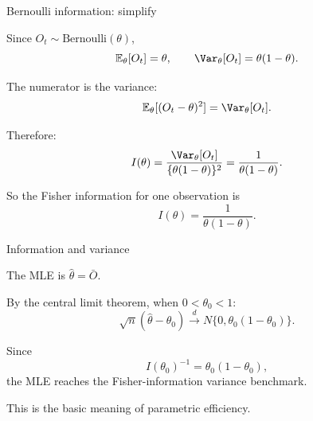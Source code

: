 \documentclass[xcolor={table}, handout]{beamer}
\begin{document}
\note{
\scriptsize \singlespacing

}
\begin{frame}{Bernoulli information: simplify}

\begin{wideitemize}
\item Since $O_t\sim\text{Bernoulli}(\theta)$,
\[
\mathbb{E}_\theta[O_t]=\theta,
\qquad
\Var_\theta[O_t]=\theta(1-\theta).
\]\pause
\item The numerator is the variance:
\[
\mathbb{E}_\theta[(O_t-\theta)^2]
  =
  \Var_\theta[O_t].
\]\pause
\item Therefore:
\[
I(\theta)
  =
  \frac{\Var_\theta[O_t]}
       {\{\theta(1-\theta)\}^2}
  =
  \frac{1}{\theta(1-\theta)}.
\]\pause
\item So the Fisher information for one observation is
\[
I(\theta)=\frac{1}{\theta(1-\theta)}.
\]
\end{wideitemize}

\end{frame}

\note{
\scriptsize \singlespacing

}
\begin{frame}{Information and variance}

\begin{wideitemize}
\item The MLE is $\hat\theta=\bar O$.\pause
\item By the central limit theorem, when $0<\theta_0<1$:
\[
\sqrt{n}(\hat\theta-\theta_0)
  \overset{d}{\rightarrow}
  N\{0,\theta_0(1-\theta_0)\}.
\]\pause
\item Since
\[
I(\theta_0)^{-1}
  =
  \theta_0(1-\theta_0),
\]
the MLE reaches the Fisher-information variance benchmark.\pause
\item This is the basic meaning of parametric efficiency.
\end{wideitemize}

\end{frame}
\end{document}
